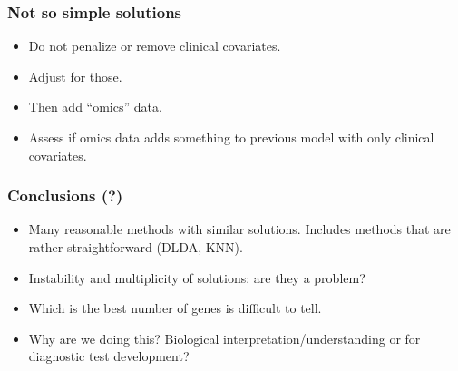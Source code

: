\begin{frame}
\frametitle{Not so simple solutions}
\begin{itemize}
\item Do not penalize or remove clinical covariates.
\item Adjust for those.
\item Then add ``omics'' data.
\item Assess if omics data adds something to previous model with only
  clinical covariates.
\end{itemize}


\end{frame}



\begin{frame}
\frametitle{Conclusions (?)}
\begin{itemize}
\item Many reasonable methods with similar solutions. Includes methods
  that are rather straightforward (DLDA, KNN).
\item Instability and multiplicity of solutions: are they a problem?
\item Which is the best number of genes is difficult to tell.
\item Why are we doing this? Biological interpretation/understanding or
  for diagnostic test development?
\end{itemize}
\end{frame}


